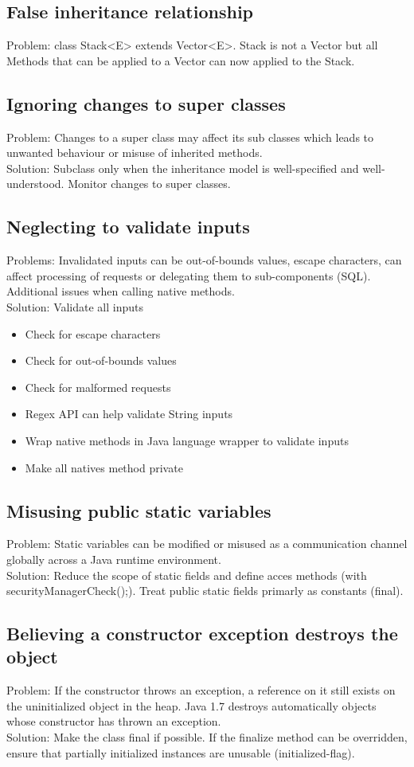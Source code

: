 \documentclass[10pt]{article}
\begin{document}
\subsection{False inheritance relationship}
Problem: class Stack<E> extends Vector<E>. Stack is not a Vector but all Methods that can be applied to a Vector can now applied to the Stack.
\subsection{Ignoring changes to super classes}
Problem: Changes to a super class may affect its sub classes which leads to unwanted behaviour or misuse of inherited methods.\\
Solution: Subclass only when the inheritance model is well-specified and well-understood. Monitor changes to super classes.
\subsection{Neglecting to validate inputs}
Problems: Invalidated inputs can be out-of-bounds values, escape characters, can affect processing of requests or delegating them to sub-components (SQL). Additional issues when calling native methods.\\
Solution: Validate all inputs
\begin{itemize}
	\item Check for escape characters
	\item Check for out-of-bounds values
	\item Check for malformed requests
	\item Regex API can help validate String inputs
	\item Wrap native methods in Java language wrapper to validate inputs
	\item Make all natives method private
\end{itemize}
\subsection{Misusing public static variables}
Problem: Static variables can be modified or misused as a communication channel globally across a Java runtime environment.\\
Solution: Reduce the scope of static fields and define acces methods (with securityManagerCheck();). Treat public static fields primarly as constants (final).

\subsection{Believing a constructor exception destroys the object}
Problem: If the constructor throws an exception, a reference on it still exists on the uninitialized object in the heap. Java 1.7 destroys automatically objects whose constructor has thrown an exception.\\
Solution: Make the class final if possible. If the finalize method can be overridden, ensure that partially initialized instances are unusable (initialized-flag).
\end{document}

